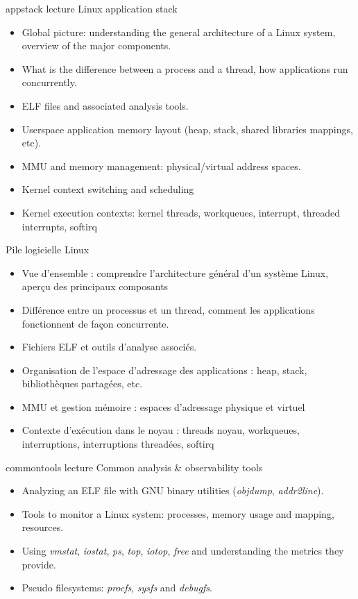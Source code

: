 {appstack}
{lecture}
{Linux application stack}
{
  \begin{itemize}
  \item Global picture: understanding the general architecture of a
        Linux system, overview of the major components.
  \item What is the difference between a process and a thread, how
    applications run concurrently.
  \item ELF files and associated analysis tools.
  \item Userspace application memory layout (heap, stack, shared
    libraries mappings, etc).
  \item MMU and memory management: physical/virtual address spaces.
  \item Kernel context switching and scheduling
  \item Kernel execution contexts: kernel threads, workqueues,
    interrupt, threaded interrupts, softirq
  \end{itemize}
}
{Pile logicielle Linux}
{
  \begin{itemize}
  \item Vue d'ensemble : comprendre l'architecture général d'un système
    Linux, aperçu des principaux composants
  \item Différence entre un processus et un thread, comment les
    applications fonctionnent de façon concurrente.
  \item Fichiers ELF et outils d'analyse associés.
  \item Organisation de l'espace d'adressage des applications : heap,
    stack, bibliothèques partagées, etc.
  \item MMU et gestion mémoire : espaces d'adressage physique et
    virtuel
  \item Contexte d'exécution dans le noyau : threads noyau, workqueues,
    interruptions, interruptions threadées, softirq
  \end{itemize}
}
{commontools}
{lecture}
{Common analysis \& observability tools}
{
  \begin{itemize}
  \item Analyzing an ELF file with GNU binary utilities
    ({\em objdump}, {\em addr2line}).
  \item Tools to monitor a Linux system: processes, memory
    usage and mapping, resources.
  \item Using {\em vmstat}, {\em iostat}, {\em ps}, {\em top}, {\em
      iotop}, {\em free} and understanding the metrics they provide.
  \item Pseudo filesystems: {\em procfs}, {\em sysfs} and {\em
      debugfs}.
  \end{itemize}
}
